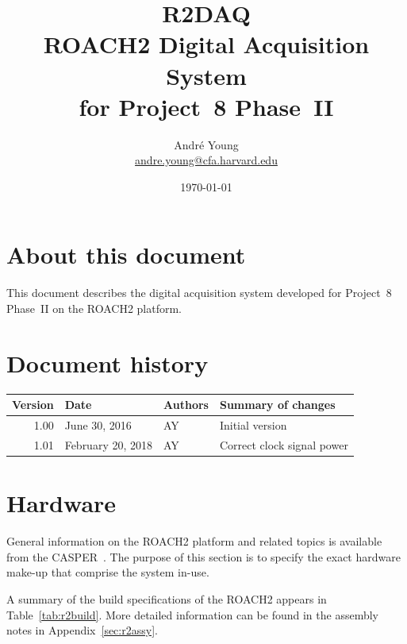 \documentclass[a4paper,10pt]{article}
\title{R2DAQ\\{\Large ROACH2 Digital Acquisition System\\for Project~8 Phase~II}}
\author{Andr\'e Young\\\url{andre.young@cfa.harvard.edu}}
\date{\today}
\newcommand{\tabref}[1]{Table~\ref{#1}}
\begin{document}
\maketitle 

\section*{About this document}
This document describes the digital acquisition system developed for 
Project~8 Phase~II on the ROACH2 platform.

\section*{Document history}
\begin{tabularx}{1.0\textwidth}{|r|l|l|X|}
	\hline
	{\bf Version} & {\bf Date} & {\bf Authors} & {\bf Summary of changes}\\
	\hline
	1.00 & June 30, 2016 & AY & Initial version\\
	\hline
	1.01 & February 20, 2018 & AY & Correct clock signal power\\
	\hline
\end{tabularx}

\tableofcontents{}
\listoffigures{}
\listoftables

\section{Hardware}
\label{sec:hardware}
General information on the ROACH2 platform and related topics is 
available from the CASPER~\cite{casperroach2}. The purpose of this section is 
to specify the exact hardware make-up that comprise the system in-use.

A summary of the build specifications of the ROACH2 appears in 
\tabref{tab:r2build}. More detailed information can be found in the 
assembly notes in Appendix~\ref{sec:r2assy}.
\end{document}
